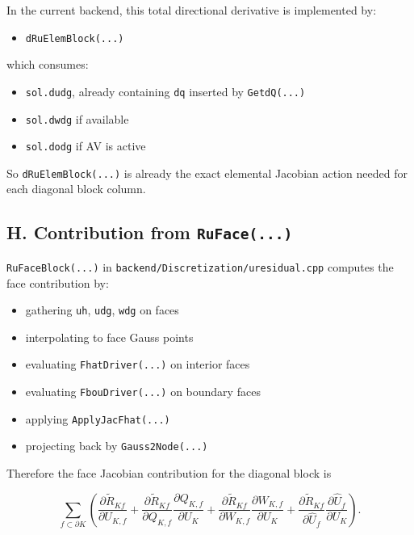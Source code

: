 \documentclass[11pt]{article}
\begin{document}
In the current backend, this total directional derivative is implemented by:

\begin{itemize}[leftmargin=*]
\item \texttt{dRuElemBlock(...)}
\end{itemize}

which consumes:

\begin{itemize}[leftmargin=*]
\item \texttt{sol.dudg}, already containing \texttt{dq} inserted by
\texttt{GetdQ(...)}
\item \texttt{sol.dwdg} if available
\item \texttt{sol.dodg} if AV is active
\end{itemize}

So \texttt{dRuElemBlock(...)} is already the exact elemental Jacobian action
needed for each diagonal block column.

\subsection*{H. Contribution from \texttt{RuFace(...)}}

\texttt{RuFaceBlock(...)} in \texttt{backend/Discretization/uresidual.cpp}
computes the face contribution by:

\begin{itemize}[leftmargin=*]
\item gathering \texttt{uh}, \texttt{udg}, \texttt{wdg} on faces
\item interpolating to face Gauss points
\item evaluating \texttt{FhatDriver(...)} on interior faces
\item evaluating \texttt{FbouDriver(...)} on boundary faces
\item applying \texttt{ApplyJacFhat(...)}
\item projecting back by \texttt{Gauss2Node(...)}
\end{itemize}

Therefore the face Jacobian contribution for the diagonal block is

\[
\sum_{f \subset \partial K}
\left(
\frac{\partial \widetilde R_{Kf}}{\partial U_{K,f}}
+
\frac{\partial \widetilde R_{Kf}}{\partial Q_{K,f}}\frac{\partial Q_{K,f}}{\partial U_K}
+
\frac{\partial \widetilde R_{Kf}}{\partial W_{K,f}}\frac{\partial W_{K,f}}{\partial U_K}
+
\frac{\partial \widetilde R_{Kf}}{\partial \hat U_f}\frac{\partial \hat U_f}{\partial U_K}
\right).
\]
\end{document}
